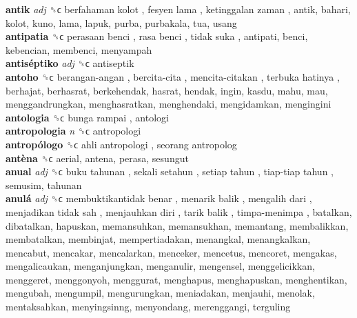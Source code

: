 \textbf{antik} \emph{adj}  ␝ϲ   berfahaman kolot ,  fesyen lama ,  ketinggalan zaman , antik, bahari, kolot, kuno, lama, lapuk, purba, purbakala, tua, usang  \\
\textbf{antipatia} ␝ϲ   perasaan benci ,  rasa benci ,  tidak suka , antipati, benci, kebencian, membenci, menyampah  \\
\textbf{antiséptiko} \emph{adj}  ␝ϲ  antiseptik  \\
\textbf{antoho} ␝ϲ   berangan-angan ,  bercita-cita ,  mencita-citakan ,  terbuka hatinya , berhajat, berhasrat, berkehendak, hasrat, hendak, ingin, kasdu, mahu, mau, menggandrungkan, menghasratkan, menghendaki, mengidamkan, mengingini  \\
\textbf{antologia} ␝ϲ   bunga rampai , antologi  \\
\textbf{antropologia} \emph{n}  ␝ϲ  antropologi  \\
\textbf{antropólogo} ␝ϲ   ahli antropologi ,  seorang antropolog   \\
\textbf{antèna} ␝ϲ  aerial, antena, perasa, sesungut  \\
\textbf{anual} \emph{adj}  ␝ϲ   buku tahunan ,  sekali setahun ,  setiap tahun ,  tiap-tiap tahun , semusim, tahunan  \\
\textbf{anulá} \emph{adj}  ␝ϲ   membuktikantidak benar ,  menarik balik ,  mengalih dari ,  menjadikan tidak sah ,  menjauhkan diri ,  tarik balik ,  timpa-menimpa , batalkan, dibatalkan, hapuskan, memansuhkan, memansukhan, memantang, membalikkan, membatalkan, membinjat, mempertiadakan, menangkal, menangkalkan, mencabut, mencakar, mencalarkan, menceker, mencetus, mencoret, mengakas, mengalicaukan, menganjungkan, menganulir, mengensel, menggelicikkan, menggeret, menggonyoh, menggurat, menghapus, menghapuskan, menghentikan, mengubah, mengumpil, mengurungkan, meniadakan, menjauhi, menolak, mentaksahkan, menyingsinng, menyondang, merenggangi, terguling  \\
